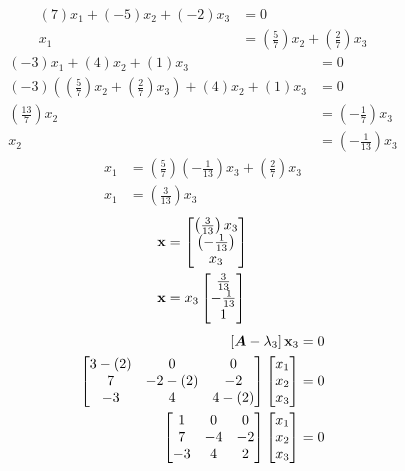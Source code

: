 \documentclass{article}
\begin{document}
\begin{align*}
	(7)x_1 + (-5)x_2 + (-2)x_3 & = 0 \\
	x_1 & = \left( \frac{5}{7} \right) x_2 + \left( \frac{2}{7} \right) x_3
\end{align*}
\begin{align*}
	(-3)x_1 + (4)x_2 + (1)x_3 & = 0 \\
	(-3) \left( \left( \frac{5}{7} \right) x_2 + \left( \frac{2}{7} \right) x_3 \right) + (4)x_2 + (1)x_3 & = 0 \\
	\left( \frac{13}{7} \right) x_2 & = \left( -\frac{1}{7} \right) x_3 \\
	x_2 & = \left( -\frac{1}{13} \right) x_3
\end{align*}
\begin{align*}
	x_1 & = \left( \frac{5}{7} \right) \left( -\frac{1}{13} \right) x_3 + \left( \frac{2}{7} \right) x_3 \\
	x_1 & = \left( \frac{3}{13} \right) x_3
\end{align*}
\begin{align*}
	\vect{x} & = \begin{bmatrix} \left( \frac{3}{13} \right) x_3 \\ \left( -\frac{1}{13} \right) \\ x_3 \end{bmatrix} \\
	\vect{x} & = x_3 \begin{bmatrix} \frac{3}{13} \\ -\frac{1}{13} \\ 1 \end{bmatrix}
\end{align*}
\begin{align*}
	\left[ \matr{A} - \lambda_3 \right] \vect{x}_3 & = 0 \\
	\begin{bmatrix}
		3 - (2) & 0 & 0 \\
		7 & -2 - (2) & -2 \\
		-3 & 4 & 4 - (2)
	\end{bmatrix}
	\begin{bmatrix} x_1 \\ x_2 \\ x_3 \end{bmatrix} & = 0 \\
	\begin{bmatrix}
		1 & 0 & 0 \\
		7 & -4 & -2 \\
		-3 & 4 & 2
	\end{bmatrix}
	\begin{bmatrix} x_1 \\ x_2 \\ x_3 \end{bmatrix} & = 0
\end{align*}
\end{document}
